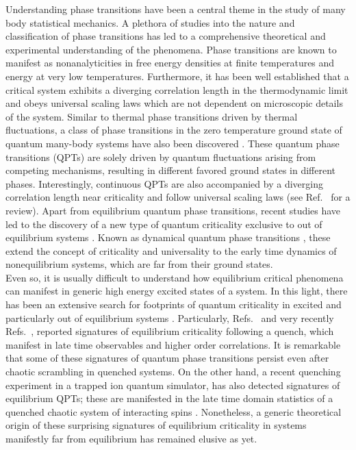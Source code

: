 \documentclass[aps,prx,twocolumn]{revtex4-2}
\begin{document}
Understanding phase transitions have been a central theme in the study of many body statistical mechanics. A plethora of studies into the nature and classification of phase transitions \cite{chaikin_lubensky,goldenfeld,stanley} has led to a comprehensive theoretical and experimental understanding of the phenomena. Phase transitions are known to manifest as nonanalyticities in free energy densities at finite temperatures and energy at very low temperatures. Furthermore, it has been well established that a critical system exhibits a diverging correlation length in the thermodynamic limit and obeys universal scaling laws which are not dependent on microscopic details of the system. Similar to thermal phase transitions driven by thermal fluctuations, a class of phase transitions in the zero temperature ground state of quantum many-body systems have also been discovered \cite{sachdev_qpt,dutta15_book}. These quantum phase transitions (QPTs) are solely driven by quantum fluctuations arising from competing mechanisms, resulting in different favored ground states in different phases. Interestingly,   {continuous} QPTs are also accompanied by a diverging correlation length near criticality and follow universal scaling laws (see Ref.~\cite{ROSSINI2021} for a review). Apart from equilibrium quantum phase transitions, recent studies have led to the discovery of a new type of quantum criticality exclusive to out of equilibrium systems \cite{anatoli11}. Known as dynamical quantum phase transitions \cite{heylpol13,karrasch13,kehrein14,sraddha16,heyl_review18,sourav18,jurcevic17,peotta21}, these extend the concept of criticality and universality to the early time dynamics of nonequilibrium systems, which are far from their ground states.\\

{Even so, it is usually difficult to understand how equilibrium critical phenomena can manifest in generic high energy excited states of a system.  In this light, there has been an extensive search for footprints of quantum criticality in excited and particularly out of equilibrium systems \cite{zanardi07,Zhang2017,heyl18,keesling19,bag19,titum19,paraj20,song21,halimeh21,ceren21,asmi21,villa21,chinni21,ikeda21,paul22,kheiri22}.} Particularly,  Refs.~\cite{halimeh21,ceren21} and very recently Refs.~\cite{asmi21,paul22}, reported signatures of equilibrium criticality following a quench, which manifest in late time observables and higher order correlations. It is remarkable that some of these signatures of quantum phase transitions persist even after chaotic scrambling in quenched systems. On the other hand, a recent quenching experiment in a trapped ion quantum simulator, has also detected signatures of equilibrium QPTs; these are manifested in the late time domain statistics of a quenched chaotic system of interacting spins \cite{Zhang2017}. Nonetheless, a generic theoretical origin of these surprising signatures of equilibrium criticality in systems manifestly far from equilibrium has remained elusive as yet.\\
\end{document}
